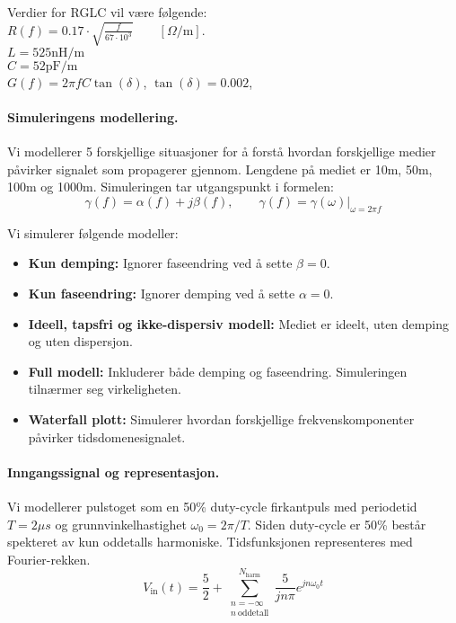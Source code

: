 \noindent Verdier for RGLC vil være følgende: \\
$R(f) = 0.17 \cdot \sqrt{\frac{f}{67 \cdot 10^3}} \qquad [\Omega / \mathrm{m}]$. \\
$L = 525 \mathrm{nH/m}$ \\
$C = 52 \mathrm{pF/m}$ \\
$G(f) = 2\pi f C \tan(\delta)$, \qquad $\tan(\delta) = 0.002$, \qquad [S/m]

\paragraph{Simuleringens modellering.}
Vi modellerer 5 forskjellige situasjoner for å forstå hvordan forskjellige medier påvirker signalet som propagerer gjennom. Lengdene på mediet er 10m, 50m, 100m og 1000m. Simuleringen tar utgangspunkt i formelen:
\[
\gamma (f) = \alpha(f) + j\beta(f), \qquad \gamma(f) = \gamma(\omega)|_{\omega = 2\pi f}
\]

\noindent Vi simulerer følgende modeller:
\begin{itemize}
    \item \textbf{Kun demping:} Ignorer faseendring ved å sette $\beta = 0$.
    \item \textbf{Kun faseendring:} Ignorer demping ved å sette $\alpha = 0$.
    \item \textbf{Ideell, tapsfri og ikke-dispersiv modell:} Mediet er ideelt, uten demping og uten dispersjon.
    \item \textbf{Full modell:} Inkluderer både demping og faseendring. Simuleringen tilnærmer seg virkeligheten.
    \item \textbf{Waterfall plott:} Simulerer hvordan forskjellige frekvenskomponenter påvirker tidsdomenesignalet.
\end{itemize}

\paragraph{Inngangssignal og representasjon.}
Vi modellerer pulstoget som en 50\% duty-cycle firkantpuls med periodetid $T = 2 \mu s$ og grunnvinkelhastighet $\omega_0 = 2\pi / T$. Siden duty-cycle er 50\% består spekteret av kun oddetalls harmoniske. Tidsfunksjonen representeres med Fourier-rekken.
\begin{equation}
    V_{\mathrm{in}}(t) = \frac{5}{2} + \sum_{\substack{n=-\infty\\ n\ \text{oddetall}}}^{N_{\mathrm{harm}}}\frac{5}{jn\pi} e^{jn\omega_0 t}
\end{equation} 

